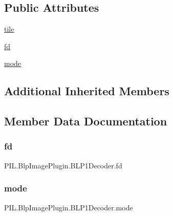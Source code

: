 \subsection*{Public Attributes}
\begin{DoxyCompactItemize}
\item 
\hyperlink{classPIL_1_1BlpImagePlugin_1_1BLP1Decoder_a23c0b2a81dad6e2f97f6ef1af65cb9db}{tile}
\item 
\hyperlink{classPIL_1_1BlpImagePlugin_1_1BLP1Decoder_aa47e7db827e49bfe34afa010fb26a4b0}{fd}
\item 
\hyperlink{classPIL_1_1BlpImagePlugin_1_1BLP1Decoder_acfb2359ac69941a93143f19db6e712d5}{mode}
\end{DoxyCompactItemize}
\subsection*{Additional Inherited Members}


\subsection{Member Data Documentation}
\mbox{\label{classPIL_1_1BlpImagePlugin_1_1BLP1Decoder_aa47e7db827e49bfe34afa010fb26a4b0}} 
\subsubsection{\texorpdfstring{fd}{fd}}
{\footnotesize\ttfamily P\+I\+L.\+Blp\+Image\+Plugin.\+B\+L\+P1\+Decoder.\+fd}

\mbox{\label{classPIL_1_1BlpImagePlugin_1_1BLP1Decoder_acfb2359ac69941a93143f19db6e712d5}} 
\subsubsection{\texorpdfstring{mode}{mode}}
{\footnotesize\ttfamily P\+I\+L.\+Blp\+Image\+Plugin.\+B\+L\+P1\+Decoder.\+mode}

